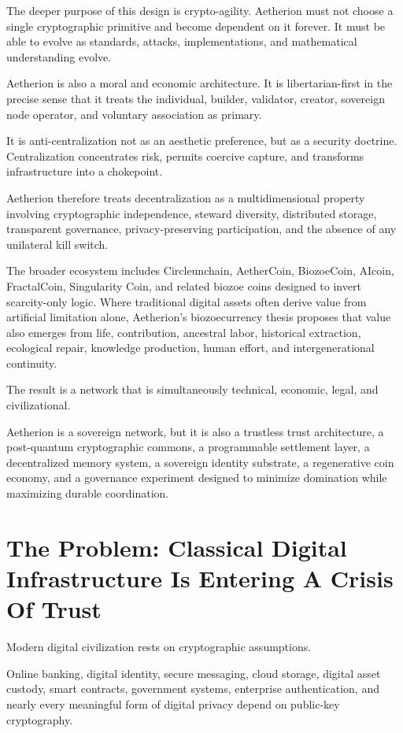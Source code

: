 ﻿\documentclass[12pt]{article}
\begin{document}
The deeper purpose of this design is crypto-agility. Aetherion must not choose a single cryptographic primitive and become dependent on it forever. It must be able to evolve as standards, attacks, implementations, and mathematical understanding evolve.

Aetherion is also a moral and economic architecture. It is libertarian-first in the precise sense that it treats the individual, builder, validator, creator, sovereign node operator, and voluntary association as primary.

It is anti-centralization not as an aesthetic preference, but as a security doctrine. Centralization concentrates risk, permits coercive capture, and transforms infrastructure into a chokepoint.

Aetherion therefore treats decentralization as a multidimensional property involving cryptographic independence, steward diversity, distributed storage, transparent governance, privacy-preserving participation, and the absence of any unilateral kill switch.

The broader ecosystem includes Circleunchain, AetherCoin, BiozoeCoin, AIcoin, FractalCoin, Singularity Coin, and related biozoe coins designed to invert scarcity-only logic. Where traditional digital assets often derive value from artificial limitation alone, Aetherion's biozoecurrency thesis proposes that value also emerges from life, contribution, ancestral labor, historical extraction, ecological repair, knowledge production, human effort, and intergenerational continuity.

The result is a network that is simultaneously technical, economic, legal, and civilizational.

Aetherion is a sovereign network, but it is also a trustless trust architecture, a post-quantum cryptographic commons, a programmable settlement layer, a decentralized memory system, a sovereign identity substrate, a regenerative coin economy, and a governance experiment designed to minimize domination while maximizing durable coordination.

\section{The Problem: Classical Digital Infrastructure Is Entering A Crisis Of Trust}


Modern digital civilization rests on cryptographic assumptions.

Online banking, digital identity, secure messaging, cloud storage, digital asset custody, smart contracts, government systems, enterprise authentication, and nearly every meaningful form of digital privacy depend on public-key cryptography.
\end{document}
